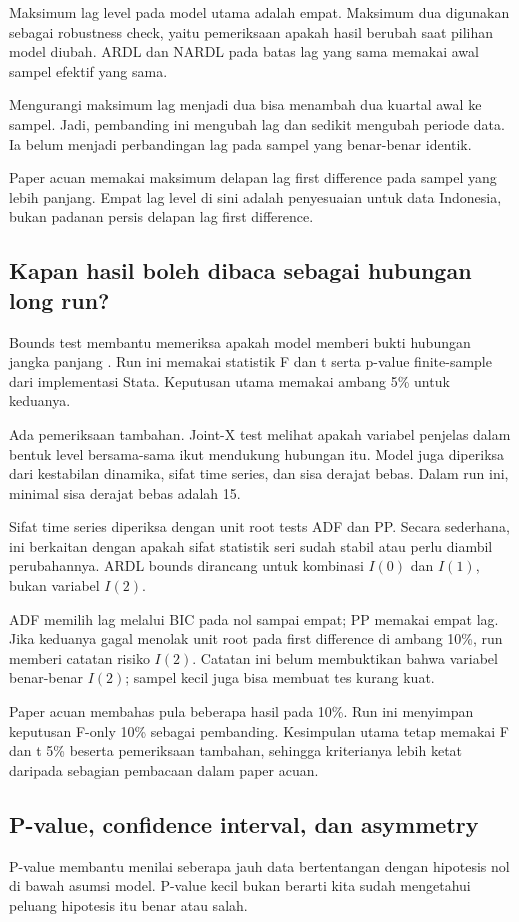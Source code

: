 Maksimum lag level pada model utama adalah empat. Maksimum dua digunakan sebagai robustness check, yaitu pemeriksaan apakah hasil berubah saat pilihan model diubah. ARDL dan NARDL pada batas lag yang sama memakai awal sampel efektif yang sama.

Mengurangi maksimum lag menjadi dua bisa menambah dua kuartal awal ke sampel. Jadi, pembanding ini mengubah lag dan sedikit mengubah periode data. Ia belum menjadi perbandingan lag pada sampel yang benar-benar identik.

Paper acuan memakai maksimum delapan lag first difference pada sampel yang lebih panjang. Empat lag level di sini adalah penyesuaian untuk data Indonesia, bukan padanan persis delapan lag first difference.

\subsection{Kapan hasil boleh dibaca sebagai hubungan long run?}
Bounds test membantu memeriksa apakah model memberi bukti hubungan jangka panjang \cite{pss,ks}. Run ini memakai statistik F dan t serta p-value finite-sample dari implementasi Stata. Keputusan utama memakai ambang 5\% untuk keduanya.

Ada pemeriksaan tambahan. Joint-X test melihat apakah variabel penjelas dalam bentuk level bersama-sama ikut mendukung hubungan itu. Model juga diperiksa dari kestabilan dinamika, sifat time series, dan sisa derajat bebas. Dalam run ini, minimal sisa derajat bebas adalah 15.

Sifat time series diperiksa dengan unit root tests ADF dan PP. Secara sederhana, ini berkaitan dengan apakah sifat statistik seri sudah stabil atau perlu diambil perubahannya. ARDL bounds dirancang untuk kombinasi $I(0)$ dan $I(1)$, bukan variabel $I(2)$.

ADF memilih lag melalui BIC pada nol sampai empat; PP memakai empat lag. Jika keduanya gagal menolak unit root pada first difference di ambang 10\%, run memberi catatan risiko $I(2)$. Catatan ini belum membuktikan bahwa variabel benar-benar $I(2)$; sampel kecil juga bisa membuat tes kurang kuat.

Paper acuan membahas pula beberapa hasil pada 10\%. Run ini menyimpan keputusan F-only 10\% sebagai pembanding. Kesimpulan utama tetap memakai F dan t 5\% beserta pemeriksaan tambahan, sehingga kriterianya lebih ketat daripada sebagian pembacaan dalam paper acuan.

\subsection{P-value, confidence interval, dan asymmetry}
P-value membantu menilai seberapa jauh data bertentangan dengan hipotesis nol di bawah asumsi model. P-value kecil bukan berarti kita sudah mengetahui peluang hipotesis itu benar atau salah.

